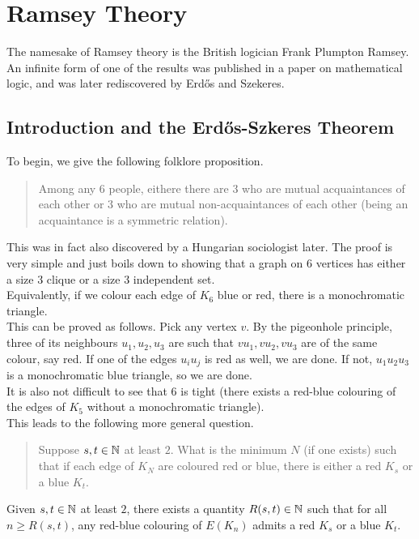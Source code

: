 \section{Ramsey Theory}

The namesake of Ramsey theory is the British logician Frank Plumpton Ramsey. An infinite form of one of the results was published in a paper on mathematical logic, and was later rediscovered by Erd\H{o}s and Szekeres.

\subsection{Introduction and the Erd\H{o}s-Szkeres Theorem}

	To begin, we give the following folklore proposition.
	\begin{quote}
		Among any 6 people, eithere there are $3$ who are mutual acquaintances of each other or $3$ who are mutual non-acquaintances of each other (being an acquaintance is a symmetric relation).
	\end{quote}

	This was in fact also discovered by a Hungarian sociologist later. The proof is very simple and just boils down to showing that a graph on $6$ vertices has either a size $3$ clique or a size $3$ independent set.\\
	Equivalently, if we colour each edge of $K_6$ blue or red, there is a monochromatic triangle.\\
	This can be proved as follows. Pick any vertex $v$. By the pigeonhole principle, three of its neighbours $u_1,u_2,u_3$ are such that $vu_1,vu_2,vu_3$ are of the same colour, say red. If one of the edges $u_iu_j$ is red as well, we are done. If not, $u_1u_2u_3$ is a monochromatic blue triangle, so we are done.\\
	It is also not difficult to see that $6$ is tight (there exists a red-blue colouring of the edges of $K_5$ without a monochromatic triangle).\\

	This leads to the following more general question.
	\begin{quote}
		Suppose $s,t\in\mathbb{N}$ at least $2$. What is the minimum $N$ (if one exists) such that if each edge of $K_N$ are coloured red or blue, there is either a red $K_s$ or a blue $K_t$.
	\end{quote}


	\begin{ftheo}
		\label{theo: ramsey number finite}
		Given $s,t\in\mathbb{N}$ at least $2$, there exists a quantity $R(s,t) \in \mathbb{N}$ such that for all $n \ge R(s,t)$, any red-blue colouring of $E(K_n)$ admits a red $K_s$ or a blue $K_t$.
	\end{ftheo}

